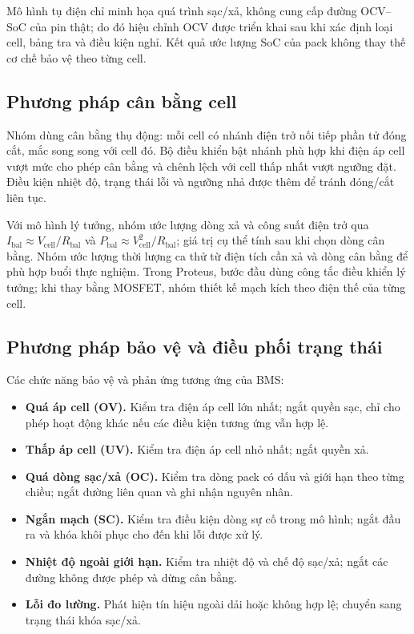 Mô hình tụ điện chỉ minh họa quá trình sạc/xả, không cung cấp đường OCV--SoC của pin thật; do đó hiệu chỉnh OCV được triển khai sau khi xác định loại cell, bảng tra và điều kiện nghỉ. Kết quả ước lượng SoC của pack không thay thế cơ chế bảo vệ theo từng cell.

\subsection{Phương pháp cân bằng cell}

Nhóm dùng cân bằng thụ động: mỗi cell có nhánh điện trở nối tiếp phần tử đóng cắt, mắc song song với cell đó. Bộ điều khiển bật nhánh phù hợp khi điện áp cell vượt mức cho phép cân bằng và chênh lệch với cell thấp nhất vượt ngưỡng đặt. Điều kiện nhiệt độ, trạng thái lỗi và ngưỡng nhả được thêm để tránh đóng/cắt liên tục.

Với mô hình lý tưởng, nhóm ước lượng dòng xả và công suất điện trở qua \(I_{\mathrm{bal}}\approx V_{\mathrm{cell}}/R_{\mathrm{bal}}\) và \(P_{\mathrm{bal}}\approx V_{\mathrm{cell}}^2/R_{\mathrm{bal}}\); giá trị cụ thể tính sau khi chọn dòng cân bằng. Nhóm ước lượng thời lượng ca thử từ điện tích cần xả và dòng cân bằng để phù hợp buổi thực nghiệm. Trong Proteus, bước đầu dùng công tắc điều khiển lý tưởng; khi thay bằng MOSFET, nhóm thiết kế mạch kích theo điện thế của từng cell.

\subsection{Phương pháp bảo vệ và điều phối trạng thái}

Các chức năng bảo vệ và phản ứng tương ứng của BMS:

\begin{itemize}
    \item \textbf{Quá áp cell (OV).} Kiểm tra điện áp cell lớn nhất; ngắt quyền sạc, chỉ cho phép hoạt động khác nếu các điều kiện tương ứng vẫn hợp lệ.
    \item \textbf{Thấp áp cell (UV).} Kiểm tra điện áp cell nhỏ nhất; ngắt quyền xả.
    \item \textbf{Quá dòng sạc/xả (OC).} Kiểm tra dòng pack có dấu và giới hạn theo từng chiều; ngắt đường liên quan và ghi nhận nguyên nhân.
    \item \textbf{Ngắn mạch (SC).} Kiểm tra điều kiện dòng sự cố trong mô hình; ngắt đầu ra và khóa khôi phục cho đến khi lỗi được xử lý.
    \item \textbf{Nhiệt độ ngoài giới hạn.} Kiểm tra nhiệt độ và chế độ sạc/xả; ngắt các đường không được phép và dừng cân bằng.
    \item \textbf{Lỗi đo lường.} Phát hiện tín hiệu ngoài dải hoặc không hợp lệ; chuyển sang trạng thái khóa sạc/xả.
\end{itemize}

